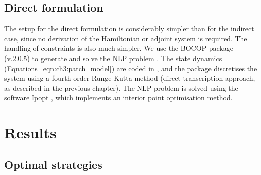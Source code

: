 \subsection{Direct formulation}

The setup for the direct formulation is considerably simpler than for the indirect case, since no derivation of the Hamiltonian or adjoint system is required. The handling of constraints is also much simpler. We use the BOCOP package (v.2.0.5) to generate and solve the NLP problem \citep{bocop}. The state dynamics (Equations~\ref{eqn:ch3:patch_model}) are coded in \CC, and the package discretises the system using a fourth order Runge-Kutta method (direct transcription approach, as described in the previous chapter). The NLP problem is solved using the software Ipopt \citep{wachter_implementation_2006}, which implements an interior point optimisation method.

\section{Results}

\subsection{Optimal strategies}

